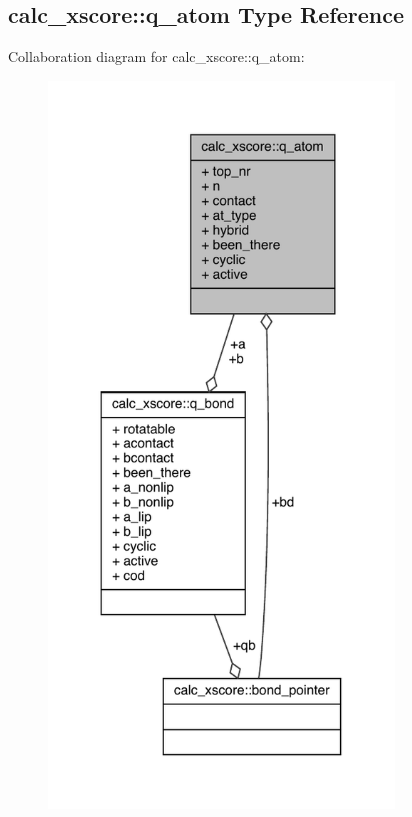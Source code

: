 \hypertarget{structcalc__xscore_1_1q__atom}{\subsection{calc\-\_\-xscore\-:\-:q\-\_\-atom Type Reference}
\label{structcalc__xscore_1_1q__atom}
}


Collaboration diagram for calc\-\_\-xscore\-:\-:q\-\_\-atom\-:
\nopagebreak
\begin{figure}[H]
\begin{center}
\leavevmode
\includegraphics[width=260pt]{structcalc__xscore_1_1q__atom__coll__graph}
\end{center}
\end{figure}
